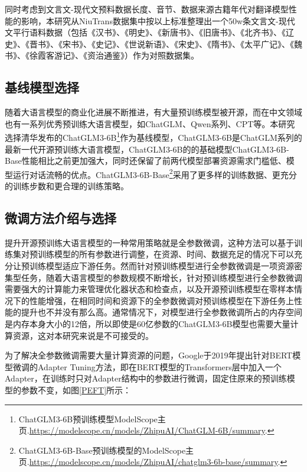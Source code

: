 \documentclass[
    decl-page,  %
    ,fontset = win, %
  ]{njuthesis}
\begin{document}
同时考虑到文言文-现代文预料数据长度、音节、数据来源古籍年代对翻译模型性能的影响，本研究从NiuTrans数据集中按以上标准整理出一个50w条文言文-现代文平行语料数据（包括《汉书》、《明史》、《新唐书》、《旧唐书》、《北齐书》、《辽史》、《晋书》、《宋书》、《史记》、《世说新语》、《宋史》、《隋书》、《太平广记》、《魏书》、《徐霞客游记》、《资治通鉴》）作为对照数据集。

\subsection{基线模型选择}
随着大语言模型的商业化进展不断推进，有大量预训练模型被开源，而在中文领域也有一系列优秀预训练大语言模型，如ChatGLM、Qwen系列、CPT等。本研究选择清华发布的ChatGLM3-6B\footnote{ChatGLM3-6B预训练模型ModelScope主页.\url{https://modelscope.cn/models/ZhipuAI/ChatGLM-6B/summary}.}作为基线模型，ChatGLM3-6B是ChatGLM系列的最新一代开源预训练大语言模型，ChatGLM3-6B的的基础模型ChatGLM3-6B-Base性能相比之前更加强大，同时还保留了前两代模型部署资源需求门槛低、模型运行对话流畅的优点。ChatGLM3-6B-Base\footnote{ChatGLM3-6B-Base预训练模型的ModelScope主页.\url{https://modelscope.cn/models/ZhipuAI/chatglm3-6b-base/summary}.}采用了更多样的训练数据、更充分的训练步数和更合理的训练策略。

\subsection{微调方法介绍与选择}
提升开源预训练大语言模型的一种常用策略就是全参数微调，这种方法可以基于训练集对预训练模型的所有参数进行调整，在资源、时间、数据充足的情况下可以充分让预训练模型适应下游任务。然而针对预训练模型进行全参数微调是一项资源密集型任务，随着大语言模型的参数规模不断增长，针对预训练模型进行全参数微调需要强大的计算能力来管理优化器状态和检查点，以及开源预训练模型在零样本情况下的性能增强，在相同时间和资源下的全参数微调对预训练模型在下游任务上性能的提升也不并没有那么高。通常情况下，对模型进行全参数微调所占的内存空间是内存本身大小的12倍\cite{sun2023comparative}，所以即使是60亿参数的ChatGLM3-6B模型也需要大量计算资源，这对本研究来说是不可接受的。

为了解决全参数微调需要大量计算资源的问题，Google于2019年提出针对BERT模型微调的Adapter Tuning方法\cite{houlsby2019parameter}，即在BERT模型的Transformers层中加入一个Adapter，在训练时只对Adapter结构中的参数进行微调，固定住原来的预训练模型的参数不变，如图\ref{PEFT}所示：
\end{document}
